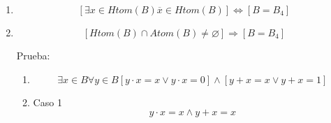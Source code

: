 \documentclass[
]{article}
\begin{document}
\begin{enumerate}
\begin{enumerate}
\begin{enumerate}
\begin{enumerate}
        \[\vee \left\lbrack {{{\left\lbrack {x\mathsf{\mathit{maximal}}\overline{y}} \right\rbrack \land \left\lbrack {\overline{x}\mathsf{\mathit{maximal}}y} \right\rbrack} \land \left\lbrack {\neg{({x\mathsf{\mathit{maximal}}y})}} \right\rbrack} \land \left\lbrack {\neg{({\overline{x}\mathsf{\mathit{maximal}}\overline{y}})}} \right\rbrack} \right\rbrack\]
      \item
        Pongamos sin pérdida de generalidad

        \[\forall{{\{{y,\overline{y}}\}} \subset B_{\ast}^{\ast}}\]

        \[\left\lbrack {{{\left\lbrack {x\mathsf{\mathit{maximal}}y} \right\rbrack \land \left\lbrack {\overline{x}\mathsf{\mathit{maximal}}\overline{y}} \right\rbrack} \land \left\lbrack {\neg{({x\mathsf{\mathit{maximal}}\overline{y}})}} \right\rbrack} \land \left\lbrack {\neg{({\overline{x}\mathsf{\mathit{maximal}}y})}} \right\rbrack} \right\rbrack \land\]

        \[\land \left\lbrack {{{\left\lbrack {x\mathsf{\mathit{maximal}}y} \right\rbrack \land \left\lbrack {\overline{x}\mathsf{\mathit{maximal}}\overline{y}} \right\rbrack} \land \left\lbrack {\neg{({x\mathsf{\mathit{maximal}}\overline{y}})}} \right\rbrack} \land \left\lbrack {\neg{({\overline{x}\mathsf{\mathit{maximal}}y})}} \right\rbrack} \right\rbrack\]
      \item
        \[\forall{{\{{y,\overline{y}}\}} \subset B_{\ast}^{\ast}}{{{y + \overline{x}} = {{1 \land y} \cdot \overline{x}}} = 0}\]
      \item
        \[\forall{{\{{y,\overline{y}}\}} \subset B_{\ast}^{\ast}}{{y = {x \land \overline{y}}} = \overline{x}}\]
      \item
        \[{B_{\ast}^{\ast} = {{\{ 1,0\}} \cup \mathit{Htom}}}{{{(B)} = {\{{1,0,x,\overline{x}}\}}} = B_{4}}\]
      \end{enumerate}
    \item
      \[\left\lbrack {\exists{x \in \mathit{Htom}}{(B)}{\overline{x} \in \mathit{Htom}}{(B)}} \right\rbrack\Leftrightarrow\left\lbrack {B = B_{4}} \right\rbrack\]
    \item
      \[\left\lbrack {\mathit{Htom}{{(B)} \cap \mathit{Atom}}{{(B)} \neq \varnothing}} \right\rbrack\Rightarrow\left\lbrack {B = B_{4}} \right\rbrack\]

      Prueba:

      \begin{enumerate}
      \def\labelenumiv{\arabic{enumiv}.}
      \item
        \[\exists{x \in B}\forall{y \in B}{\left\lbrack {{{y \cdot x} = {x \vee {y \cdot x}}} = 0} \right\rbrack \land \left\lbrack {{{y + x} = {{x \vee y} + x}} = 1} \right\rbrack}\]
      \item
        Caso 1 \[{{y \cdot x} = {{x \land y} + x}} = x\]


\end{enumerate}
\end{enumerate}
\end{enumerate}
\end{enumerate}
\end{document}
